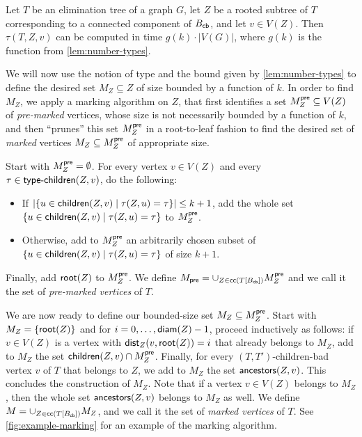 \documentclass[a4paper,UKenglish,cleveref, autoref, thm-restate]{lipics-v2021}
\newcommand{\child}{{\sf children}\xspace}
\renewcommand{\root}{{\sf root}\xspace}
\newcommand{\anc}{{\sf ancestors}\xspace}
\newcommand{\dist}{{\sf dist}\xspace}
\newcommand{\diam}{{\sf diam}\xspace}
\newcommand{\Bcb}{B_{\sf cb}\xspace}
\newcommand{\typechild}{{\sf type\text{-}children}\xspace}
\begin{document}
\begin{observation}\label{obs:computation-types}
Let $T$ be an elimination tree of a graph $G$, let $Z$ be a rooted subtree of $T$ corresponding to a connected component of $\Bcb$, and let $v \in V(Z)$. Then  $\tau(T,Z,v)$ can be computed in time $g(k) \cdot |V(G)|$, where $g(k)$ is the function from \autoref{lem:number-types}.
\end{observation}

We will now use the notion of type and the bound given by \autoref{lem:number-types} to define the desired set
$M_Z \subseteq Z$ of size bounded by a function of $k$.
In order to find $M_Z$, we apply a  marking algorithm on $Z$, that first identifies a set $M_Z^{\sf pre} \subseteq V(Z)$ of \textit{pre-marked} vertices, whose size is not necessarily bounded by a function of $k$, and then ``prunes'' this set $M_Z^{\sf pre}$ in a root-to-leaf fashion to find the desired  set of \textit{marked} vertices $M_Z \subseteq M_Z^{\sf pre}$ of appropriate size.





Start with $M_Z^{\sf pre}= \emptyset$. For every vertex $v \in V(Z)$ and every $\tau \in \typechild(Z,v)$, do the following:
\begin{itemize}
  \item If $|\{u \in \child(Z,v) \mid \tau(Z,u) = \tau\}| \leq k +1$, add the whole set $\{u \in \child(Z,v) \mid \tau(Z,u) = \tau\}$ to $M_Z^{\sf pre}$.
  \item Otherwise, add to $M_Z^{\sf pre}$ an arbitrarily chosen subset of $\{u \in \child(Z,v) \mid \tau(Z,u) = \tau\}$ of size $k+1$.
\end{itemize}

Finally, add $\root(Z)$ to $M_Z^{\sf pre}$. We define $M_{\sf pre} = \cup_{Z \in {\sf cc}(T[\Bcb])}M_Z^{\sf pre}$ and we call it the set of \emph{pre-marked vertices} of $T$.

We are now ready to define our bounded-size set $M_Z \subseteq M_Z^{\sf pre}$. Start with $M_Z=\{\root(Z)\}$ and for $i = 0,\ldots, \diam(Z)-1$, proceed inductively as follows: if $v \in V(Z)$ is a vertex with $\dist_Z(v,\root(Z))=i$ that already belongs to $M_Z$, add to $M_Z$ the set $\child(Z,v) \cap M_Z^{\sf pre}$. Finally, for every $(T,T')$-children-bad vertex $v$ of $T$ that belongs to $Z$, we add to $M_Z$ the set $\anc(Z,v)$. This concludes the construction of $M_Z$. Note that if a vertex $v \in V(Z)$ belongs to $M_Z$, then the whole set $\anc(Z,v)$ belongs to $M_Z$ as well. We define $M = \cup_{Z \in {\sf cc}(T[\Bcb])}M_Z$, and we call it the set of \emph{marked vertices} of $T$. See \autoref{fig:example-marking} for an example of the marking algorithm.
\end{document}
